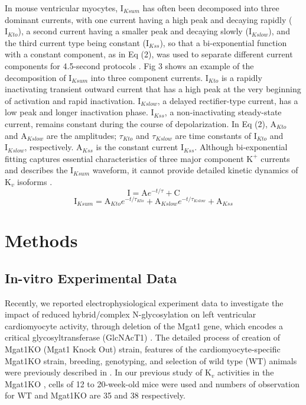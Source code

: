 \documentclass[10pt,letterpaper]{article}
\begin{document}
In mouse ventricular myocytes, $\text{I}_{Ksum}$ has often been decomposed into three dominant currents, with one current having a high peak and decaying rapidly ($\text{I}_{Kto}$), a second current having a smaller peak and decaying slowly ($\text{I}_{Kslow}$), and the third current type being constant ($\text{I}_{Kss}$), so that a bi-exponential function with a constant component, as in Eq (2), was used to separate different current components for 4.5-second protocols \cite{ednie2015reduced}. Fig 3 shows an example of the decomposition of $\text{I}_{Ksum}$ into three component currents. $\text{I}_{Kto}$ is a rapidly inactivating transient outward current that has a high peak at the very beginning of activation and rapid inactivation. $\text{I}_{Kslow}$, a delayed rectifier-type current, has a low peak and longer inactivation phase. $\text{I}_{Kss}$, a non-inactivating steady-state current, remains constant during the course of depolarization. In Eq (2), $\text{A}_{Kto}$ and $\text{A}_{Kslow}$ are the amplitudes; $\tau_{Kto}$ and $\tau_{Kslow}$ are time constants of $\text{I}_{Kto}$ and $\text{I}_{Kslow}$, respectively. $\text{A}_{Kss}$ is the constant current $\text{I}_{Kss}$. Although bi-exponential fitting captures essential characteristics of three major component $\text{K}^{+}$ currents and describes the $\text{I}_{Ksum}$ waveform, it cannot provide detailed kinetic dynamics of $\text{K}_{v}$ isoforms \cite{plumlee2016calibrating}. 
\begin{equation}
\label{standaed exponential}
    \text{I} = \text{A}e^{-t/\tau} + \text{C}
\end{equation}
\begin{equation}
\label{bi-exponential}
    \text{I}_{Ksum} = \text{A}_{Kto} e^{-t/\tau_{Kto}} + \text{A}_{Kslow} e^{-t/\tau_{Kslow}} + \text{A}_{Kss}
\end{equation}

\section*{Methods}
\subsection*{In-vitro Experimental Data}
Recently, we reported electrophysiological experiment data to investigate the impact of reduced hybrid/complex N-glycosylation on left ventricular cardiomyocyte activity, through deletion of the Mgat1 gene, which encodes a critical glycosyltransferase (GlcNAcT1) \cite{ednie2019reduced, ednie2019reduced2}. The detailed process of creation of Mgat1KO (Mgat1 Knock Out) strain, features of the cardiomyocyte-specific Mgat1KO strain, breeding, genotyping, and selection of wild type (WT) animals were previously described in \cite{ednie2019reduced2}. In our previous study of $\text{K}_{v}$ activities in the Mgat1KO \cite{ednie2019reduced}, cells of 12 to 20-week-old mice were used and numbers of observation for WT and Mgat1KO are 35 and 38 respectively.
\end{document}
